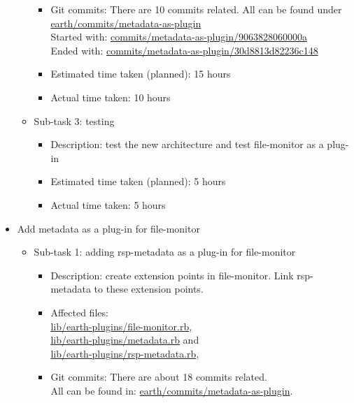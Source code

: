 \documentclass{article}
\begin{document}
\begin{itemize}
\begin{itemize}
\begin{itemize}
				\item Git commits: There are 10 commits related. All can be found under \href{http://github.com/mfbDev/earth/commits/metadata_as_plugin}{earth/commits/metadata-as-plugin}\\
Started with: \href{http://github.com/mfbDev/earth/commits/metadata_as_plugin/9063828060000a}{commits/metadata-as-plugin/9063828060000a} \\
Ended with: \href{http://github.com/mfbDev/earth/commits/metadata_as_plugin/30d8813d82236c148}{commits/metadata-as-plugin/30d8813d82236c148}
				\item Estimated time taken (planned): 15 hours
				\item Actual time taken: 10 hours
			\end{itemize}
		\item Sub-task 3: testing
			\begin{itemize}
				\item Description: test the new architecture and test file-monitor as a plug-in
				\item Estimated time taken (planned): 5 hours
				\item Actual time taken: 5 hours 
			\end{itemize}
		\end{itemize}
	\item Add metadata as a plug-in for file-monitor
		\begin{itemize}
			\item Sub-task 1: adding rsp-metadata as a plug-in for file-monitor
				\begin{itemize}
					\item Description: create extension points in file-monitor. Link rsp-metadata to these extension points.
					\item Affected files:\\
\href{http://github.com/mfbDev/earth/tree/master/lib/earth_plugins/file_monitor.rb}{lib/earth-plugins/file-monitor.rb},\\ 
\href{http://github.com/mfbDev/earth/tree/master/lib/earth_plugins/metadata.rb}{lib/earth-plugins/metadata.rb} and \\
\href{http://github.com/mfbDev/earth/tree/master/lib/earth_plugins/rsp_metadata.rb}{lib/earth-plugins/rsp-metadata.rb},
					\item Git commits: There are about 18 commits related.\\
All can be found in: \href{http://github.com/mfbDev/earth/commits/metadata_as_plugin}{earth/commits/metadata-as-plugin}.\\

\end{itemize}
\end{itemize}
\end{itemize}
\end{document}
